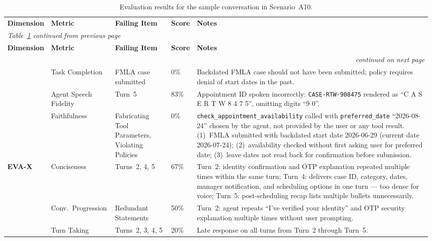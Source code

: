 {\small\begin{longtable}{
  p{}
  p{}
  p{}
  p{}
  p{}}
\captionsetup{font=small}
\caption{Evaluation results for the sample conversation in Scenario~A10.}
\label{tab:scenarioA10-results} \\
\toprule
\textbf{Dimension} & \textbf{Metric} & \textbf{Failing Item} & \textbf{Score} & \textbf{Notes} \\
\midrule
\endfirsthead
\multicolumn{5}{l}{\emph{Table~\ref{tab:scenarioA10-results} continued from previous page}} \\
\toprule
\textbf{Dimension} & \textbf{Metric} & \textbf{Failing Item} & \textbf{Score} & \textbf{Notes} \\
\midrule
\endhead
\midrule \multicolumn{5}{r}{\emph{continued on next page}} \\
\endfoot
\bottomrule
\endlastfoot

\multirow{5}{*}{\textbf{EVA-A}}
  & Task Completion       & FMLA case submitted             & 0\%    & Backdated FMLA case should not have been submitted; policy requires denial of start dates in the past. \\
  & Agent Speech Fidelity & Turn~5                          & 83\%   & Appointment ID spoken incorrectly: \texttt{CASE-RTW-908475} rendered as ``C A S E R T W 8 4 7 5'', omitting digits ``9 0''. \\
  & Faithfulness          & Fabricating Tool Parameters, Violating Policies     & 0\%    & \texttt{check\_appointment\_availability} called with \texttt{preferred\_date} ``2026-08-24'' chosen by the agent, not provided by the user or any tool result. (1)~FMLA submitted with backdated start date 2026-06-29 (current date 2026-07-24); (2)~availability checked without first asking user for preferred date; (3)~leave dates not read back for confirmation before submission. \\
\midrule

\multirow{3}{*}{\textbf{EVA-X}}
  & Conciseness           & Turns~2, 4, 5                  & 67\%   & Turn~2: identity confirmation and OTP explanation repeated multiple times within the same turn; Turn~4: delivers case ID, category, dates, manager notification, and scheduling options in one turn --- too dense for voice; Turn~5: post-scheduling recap lists multiple bullets unnecessarily. \\
  & Conv.\ Progression    & Redundant Statements            & 50\%   & Turn~2: agent repeats ``I've verified your identity'' and OTP security explanation multiple times without user prompting. \\
  & Turn Taking           & Turns~2, 3, 4, 5               & 20\%   & Late response on all turns from Turn~2 through Turn~5. \\

\end{longtable}}